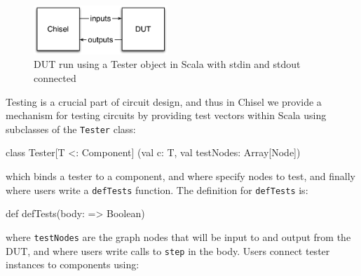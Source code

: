 \documentclass[10pt,twocolumn]{article}
\def\code#1{{\small\tt #1}}
\begin{document}
%  
% 
% 
% 
% 
% 
 
\begin{figure}
\begin{center}
\includegraphics[width=0.45\textwidth]{../tutorial/figs/DUT.pdf}
\end{center}
\caption{DUT run using a Tester object in Scala with stdin and stdout connected}
\label{fig:dut}
\end{figure}
 
Testing is a crucial part of circuit design, 
and thus in Chisel we provide a mechanism for
testing circuits by providing test vectors within Scala using
subclasses of the \code{Tester} class:

\begin{scala}
class Tester[T <: Component]
  (val c: T, val testNodes: Array[Node])
\end{scala}

\noindent
which binds a tester to a component, and where specify nodes to test,
and finally where users write a \code{defTests} function.
The definition for \code{defTests} is:

\begin{scala}
def defTests(body: => Boolean)
\end{scala}

\noindent
where \code{testNodes} are the graph nodes that will be input to and
output from the DUT, and where
users write calls to \code{step} in the body.  Users connect tester
instances to components using:
\end{document}
